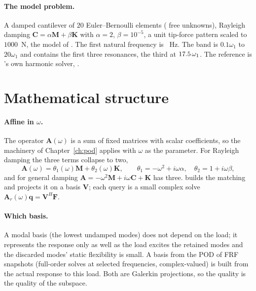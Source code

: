 \paragraph{The model problem.}
A damped cantilever of $20$ Euler--Bernoulli elements (\cfrNFree{} free unknowns), Rayleigh damping $\bm C=\alpha\bm M+\beta\bm K$ with $\alpha=2$, $\beta=10^{-5}$, a unit tip-force pattern scaled to $1000$~N, the model of . The first natural frequency is \cfrFOne{}~Hz. The band is $0.1\omega_1$ to $20\omega_1$ and contains the first three resonances, the third at $17.5\,\omega_1$. The reference is \fea{}'s own harmonic solver, .

\section{Mathematical structure}\label{sec:fr-math}

\paragraph{Affine in $\omega$.}
The operator $\bm A(\omega)$ is a sum of fixed matrices with scalar coefficients, so the machinery of Chapter~\ref{ch:pod} applies with $\omega$ as the parameter. For Rayleigh damping the three terms collapse to two,
\begin{equation}\label{eq:fr-affine}
\bm A(\omega)=\theta_1(\omega)\bm M+\theta_2(\omega)\bm K,\qquad \theta_1=-\omega^2+i\omega\alpha,\quad \theta_2=1+i\omega\beta,
\end{equation}
and for general damping $\bm A=-\omega^2\bm M+i\omega\bm C+\bm K$ has three.  builds the matching  and projects it on a basis $\bm V$; each query is a small complex solve $\bm A_r(\omega)\bm q=\bm V^H\bm F$.

\paragraph{Which basis.}
A modal basis (the lowest undamped modes) does not depend on the load; it represents the response only as well as the load excites the retained modes and the discarded modes' static flexibility is small. A basis from the POD of FRF snapshots (full-order solves at selected frequencies, complex-valued) is built from the actual response to this load. Both are Galerkin projections, so the quality is the quality of the subspace.

